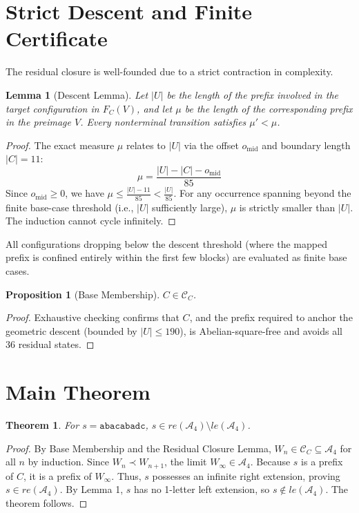 \documentclass[12pt]{article}
\newtheorem{theorem}{Theorem}
\newtheorem{lemma}{Lemma}
\newtheorem{proposition}{Proposition}
\begin{document}
\section{Strict Descent and Finite Certificate}
The residual closure is well-founded due to a strict contraction in complexity.

\begin{lemma}[Descent Lemma]
Let $|U|$ be the length of the prefix involved in the target configuration in $F_C(V)$, and let $\mu$ be the length of the corresponding prefix in the preimage $V$. Every nonterminal transition satisfies $\mu' < \mu$.
\end{lemma}
\begin{proof}
The exact measure $\mu$ relates to $|U|$ via the offset $o_{\mathrm{mid}}$ and boundary length $|C| = 11$:
$$\mu = \frac{|U| - |C| - o_{\mathrm{mid}}}{85}$$
Since $o_{\mathrm{mid}} \ge 0$, we have $\mu \le \frac{|U| - 11}{85} < \frac{|U|}{85}$. For any occurrence spanning beyond the finite base-case threshold (i.e., $|U|$ sufficiently large), $\mu$ is strictly smaller than $|U|$. The induction cannot cycle infinitely.
\end{proof}

All configurations dropping below the descent threshold (where the mapped prefix is confined entirely within the first few blocks) are evaluated as finite base cases. 

\begin{proposition}[Base Membership]
$C \in \mathcal{C}_C$.
\end{proposition}
\begin{proof}
Exhaustive checking confirms that $C$, and the prefix required to anchor the geometric descent (bounded by $|U| \le 190$), is Abelian-square-free and avoids all 36 residual states.
\end{proof}


\section{Main Theorem}

\begin{theorem}
For $s = \texttt{abacabadc}$, $s \in re(\mathcal{A}_4) \setminus le(\mathcal{A}_4)$.
\end{theorem}
\begin{proof}
By Base Membership and the Residual Closure Lemma, $W_n \in \mathcal{C}_C \subseteq \mathcal{A}_4$ for all $n$ by induction. Since $W_n \prec W_{n+1}$, the limit $W_\infty \in \mathcal{A}_4$.
Because $s$ is a prefix of $C$, it is a prefix of $W_\infty$. Thus, $s$ possesses an infinite right extension, proving $s \in re(\mathcal{A}_4)$.
By Lemma 1, $s$ has no 1-letter left extension, so $s \notin le(\mathcal{A}_4)$.
The theorem follows.
\end{proof}
\end{document}

